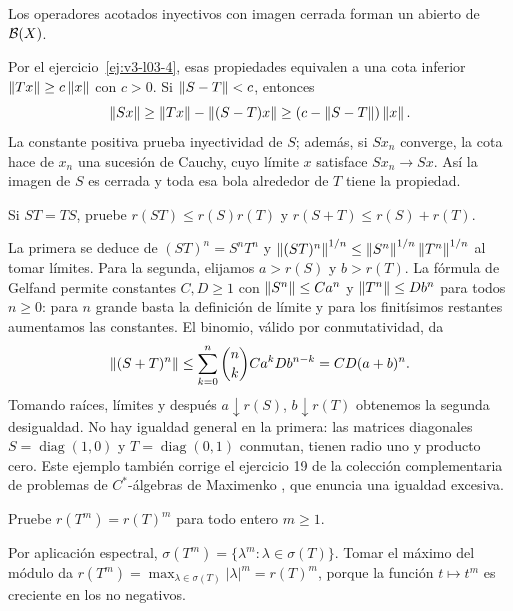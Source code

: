 \begin{ejercicio}\label{ej:v3-l08-8}
Los operadores acotados inyectivos con imagen cerrada forman un abierto de $\mathcal B(X)$.
\end{ejercicio}
\begin{solucion}
Por el ejercicio~\ref{ej:v3-l03-4}, esas propiedades equivalen a una cota inferior $\left\lVert Tx\right\rVert\ge c\left\lVert x\right\rVert$ con $c>0$. Si $\left\lVert S-T\right\rVert<c$, entonces
\[\left\lVert Sx\right\rVert\ge\left\lVert Tx\right\rVert-\left\lVert(S-T)x\right\rVert\ge(c-\left\lVert S-T\right\rVert)\left\lVert x\right\rVert.
\]
La constante positiva prueba inyectividad de $S$; además, si $Sx_n$ converge, la cota hace de $x_n$ una sucesión de Cauchy, cuyo límite $x$ satisface $Sx_n\to Sx$. Así la imagen de $S$ es cerrada y toda esa bola alrededor de $T$ tiene la propiedad.
\end{solucion}

\begin{ejercicio}\label{ej:v3-l09-1}
Si $ST=TS$, pruebe $r(ST)\le r(S)r(T)$ y $r(S+T)\le r(S)+r(T)$.
\end{ejercicio}
\begin{solucion}
La primera se deduce de $(ST)^n=S^nT^n$ y $\left\lVert(ST)^n\right\rVert^{1/n}\le\left\lVert S^n\right\rVert^{1/n}\left\lVert T^n\right\rVert^{1/n}$ al tomar límites. Para la segunda, elijamos $a>r(S)$ y $b>r(T)$. La fórmula de Gelfand permite constantes $C,D\ge1$ con $\left\lVert S^n\right\rVert\le Ca^n$ y $\left\lVert T^n\right\rVert\le Db^n$ para todos $n\ge0$: para $n$ grande basta la definición de límite y para los finitísimos restantes aumentamos las constantes. El binomio, válido por conmutatividad, da
\[\left\lVert(S+T)^n\right\rVert\le\sum_{k=0}^n\binom nk Ca^kDb^{n-k}=CD(a+b)^n.
\]
Tomando raíces, límites y después $a\downarrow r(S)$, $b\downarrow r(T)$ obtenemos la segunda desigualdad. No hay igualdad general en la primera: las matrices diagonales $S=\operatorname{diag}(1,0)$ y $T=\operatorname{diag}(0,1)$ conmutan, tienen radio uno y producto cero. Este ejemplo también corrige el ejercicio 19 de la colección complementaria de problemas de $C^*$-álgebras de Maximenko \cite{maxproblemas}, que enuncia una igualdad excesiva.
\end{solucion}

\begin{ejercicio}\label{ej:v3-l09-2}
Pruebe $r(T^m)=r(T)^m$ para todo entero $m\ge1$.
\end{ejercicio}
\begin{solucion}
Por aplicación espectral, $\sigma(T^m)=\{\lambda^m:\lambda\in\sigma(T)\}$. Tomar el máximo del módulo da $r(T^m)=\max_{\lambda\in\sigma(T)}|\lambda|^m=r(T)^m$, porque la función $t\mapsto t^m$ es creciente en los no negativos.
\end{solucion}

